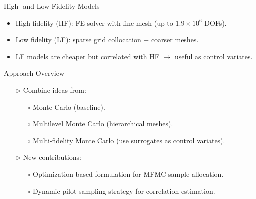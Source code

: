 \documentclass{beamer}
\begin{document}
\begin{frame}{High- and Low-Fidelity Models}
    \begin{itemize}
        \item High fidelity (HF): FE solver with fine mesh (up to $1.9 \times 10^6$ DOFs).
        \item Low fidelity (LF): sparse grid collocation + coarser meshes.
        \item LF models are cheaper but correlated with HF $\rightarrow$ useful as control variates.
    \end{itemize}
\end{frame}

\begin{frame}{Approach Overview}
    \begin{itemize}[leftmargin=5pt] 
        \item[$\triangleright$] Combine ideas from:
        \begin{itemize}[leftmargin=15pt] 
            \item[$\circ$]  Monte Carlo (baseline).
            \item[$\circ$] Multilevel Monte Carlo (hierarchical meshes).
            \item[$\circ$] Multi-fidelity Monte Carlo (use surrogates as control variates).
        \end{itemize}
        \item[$\triangleright$] New contributions:
        \begin{itemize}[leftmargin=15pt] 
            \item[$\circ$] Optimization-based formulation for MFMC sample allocation.
            \item[$\circ$] Dynamic pilot sampling strategy for correlation estimation.
        \end{itemize}
    \end{itemize}
\end{frame}
\end{document}
